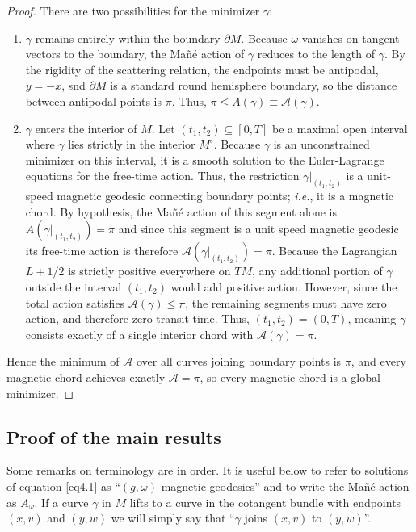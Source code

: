 \documentclass[12pt]{amsart}
\numberwithin{equation}{section}
\begin{document}
\begin{proof}
There are two possibilities for the minimizer $\gamma$:
\begin{enumerate}
    \item $\gamma$ remains entirely within the boundary $\partial M$. Because $\omega$ vanishes on tangent vectors to the boundary, the Ma\~n\'e action of $\gamma$ reduces to the length of $\gamma$. By the rigidity of the scattering relation, the endpoints must be antipodal, $y = -x$, snd $\partial M$ is a standard round hemisphere boundary, so the distance between antipodal points is $\pi$. Thus, $\pi\le A(\gamma)\equiv {\mathcal A}(\gamma) $.

    \item $\gamma$ enters the interior of $M$. Let $(t_1, t_2) \subseteq [0, T]$ be a maximal open interval where $\gamma$ lies strictly in the interior $M^\circ$. Because $\gamma$ is an unconstrained minimizer on this interval, it is a smooth solution to the Euler-Lagrange equations for the free-time action. Thus, the restriction $\gamma|_{(t_1, t_2)}$ is a unit-speed magnetic geodesic connecting boundary points; \emph{i.e.}, it is a magnetic chord. By hypothesis, the Ma\~n\'e action of this segment alone is $A\left (\gamma|_{(t_1, t_2)}\right ) =\pi$ and since this segment is a unit speed magnetic geodesic its free-time action is therefore ${\mathcal A}\left (\gamma|_{(t_1, t_2)}\right )=\pi$. Because the Lagrangian $L+1/2$ is strictly positive everywhere on $TM$, any additional portion of $\gamma$ outside the interval $(t_1, t_2)$ would add positive action. However, since the total action satisfies ${\mathcal A}(\gamma) \le \pi$, the remaining segments must have zero action, and therefore zero transit time. Thus, $(t_1, t_2) = (0, T)$, meaning $\gamma$ consists exactly of a single interior chord with ${\mathcal A}(\gamma) = \pi$.
\end{enumerate}

Hence the minimum of ${\mathcal A}$ over all curves joining boundary points is $\pi$, and every magnetic chord achieves exactly ${\mathcal A} = \pi$, so every magnetic chord is a global minimizer.
\end{proof}

\subsection{Proof of the main results}\label{section4.6}

Some remarks on terminology are in order. It is useful below to refer to solutions of equation \eqref{eq4.1} as ``$(g,\omega)$ magnetic geodesics'' and to write the Ma\~n\'e action as $A_{\omega}$. If a curve $\gamma$ in $M$ lifts to a curve in the cotangent bundle with endpoints $(x,v)$ and $(y,w)$ we will simply say that ``$\gamma$ joins $(x,v)$ to $(y,w)$''.
\end{document}
